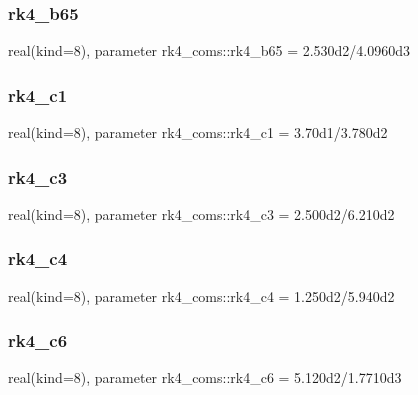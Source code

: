 \subsubsection{\texorpdfstring{rk4\+\_\+b65}{rk4\_b65}}
{\footnotesize\ttfamily real(kind=8), parameter rk4\+\_\+coms\+::rk4\+\_\+b65 = 2.\+530d2/4.\+0960d3}

\mbox{\label{namespacerk4__coms_a1dd142bdfa35986937ac4396a759dda0}} 
\subsubsection{\texorpdfstring{rk4\+\_\+c1}{rk4\_c1}}
{\footnotesize\ttfamily real(kind=8), parameter rk4\+\_\+coms\+::rk4\+\_\+c1 = 3.\+70d1/3.\+780d2}

\mbox{\label{namespacerk4__coms_a94a604a5d0d271bf875f0fd3338fef3e}} 
\subsubsection{\texorpdfstring{rk4\+\_\+c3}{rk4\_c3}}
{\footnotesize\ttfamily real(kind=8), parameter rk4\+\_\+coms\+::rk4\+\_\+c3 = 2.\+500d2/6.\+210d2}

\mbox{\label{namespacerk4__coms_ae29e60a0912723f4124b219bb67135d8}} 
\subsubsection{\texorpdfstring{rk4\+\_\+c4}{rk4\_c4}}
{\footnotesize\ttfamily real(kind=8), parameter rk4\+\_\+coms\+::rk4\+\_\+c4 = 1.\+250d2/5.\+940d2}

\mbox{\label{namespacerk4__coms_a50aa680b806d041ad4b2d83b838ce6e4}} 
\subsubsection{\texorpdfstring{rk4\+\_\+c6}{rk4\_c6}}
{\footnotesize\ttfamily real(kind=8), parameter rk4\+\_\+coms\+::rk4\+\_\+c6 = 5.\+120d2/1.\+7710d3}

